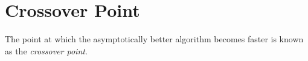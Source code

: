 \documentclass[usletter, 12pt]{article}
\begin{document}





    \section{Crossover Point}

        The point at which the asymptotically better algorithm becomes faster is known as the \textit{crossover point}.
\end{document}
